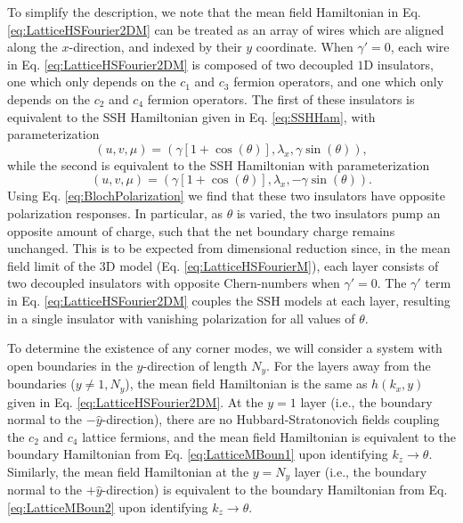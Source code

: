 \documentclass[prb,aps,twocolumn,groupaddress,floatfix]{revtex4-1}
\begin{document}
To simplify the description, we note that the mean field Hamiltonian in Eq. \ref{eq:LatticeHSFourier2DM} can be treated as an array of wires which are aligned along the $x$-direction, and indexed by their $y$ coordinate. When $\gamma' = 0$, each wire in Eq. \ref{eq:LatticeHSFourier2DM} is composed of two decoupled $1$D insulators, one which only depends on the $c_1$ and $c_3$ fermion operators, and one which only depends on the $c_2$ and $c_4$ fermion operators. The first of these insulators is equivalent to the SSH Hamiltonian given in Eq. \ref{eq:SSHHam}, with parameterization \begin{equation}
(u,v,\mu) = (\gamma[1+\cos(\theta)], \lambda_x ,\gamma\sin(\theta)),
\end{equation}
while the second is equivalent to the SSH Hamiltonian with parameterization 
\begin{equation}
(u,v,\mu) = (\gamma[1+\cos(\theta)], \lambda_x ,-\gamma\sin(\theta)).
\end{equation}
Using Eq. \ref{eq:BlochPolarization} we find that these two insulators have opposite polarization responses. In particular, as $\theta$ is varied, the two insulators pump an opposite amount of charge, such that the net boundary charge remains unchanged. This is to be expected from dimensional reduction since, in the mean field limit of the $3$D model (Eq. \ref{eq:LatticeHSFourierM}), each layer consists of two decoupled insulators with opposite Chern-numbers when $\gamma' = 0$. The $\gamma'$ term in Eq. \ref{eq:LatticeHSFourier2DM} couples the SSH models at each layer, resulting in a single insulator with vanishing polarization for all values of $\theta$. 

To determine the existence of any corner modes, we will consider a system with open boundaries in the $y$-direction of length $N_y$. For the layers away from the boundaries  ($y\neq 1,N_y$), the mean field Hamiltonian is the same as $h(k_x, y)$ given in Eq. \ref{eq:LatticeHSFourier2DM}. At the $y = 1$ layer (i.e., the boundary normal to the $-\hat{y}$-direction), there are no Hubbard-Stratonovich fields coupling the $c_2$ and $c_4$ lattice fermions, and the mean field Hamiltonian is equivalent to the boundary Hamiltonian from Eq. \ref{eq:LatticeMBoun1} upon identifying $k_z \rightarrow \theta$. Similarly, the mean field Hamiltonian at the $y = N_y$ layer (i.e., the boundary normal to the $+\hat{y}$-direction) is equivalent to the boundary Hamiltonian from Eq. \ref{eq:LatticeMBoun2} upon identifying $k_z \rightarrow \theta$. 
\end{document}
